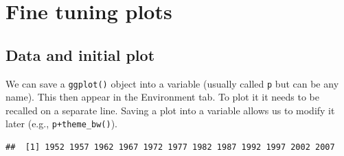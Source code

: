 \documentclass[]{book}
\makeatletter
\newenvironment{Shaded}{\begin{snugshade}}{\end{snugshade}}
\newcommand{\KeywordTok}[1]{\textcolor[rgb]{0.13,0.29,0.53}{\textbf{#1}}}
\newcommand{\DataTypeTok}[1]{\textcolor[rgb]{0.13,0.29,0.53}{#1}}
\newcommand{\DecValTok}[1]{\textcolor[rgb]{0.00,0.00,0.81}{#1}}
\newcommand{\FloatTok}[1]{\textcolor[rgb]{0.00,0.00,0.81}{#1}}
\newcommand{\StringTok}[1]{\textcolor[rgb]{0.31,0.60,0.02}{#1}}
\newcommand{\OtherTok}[1]{\textcolor[rgb]{0.56,0.35,0.01}{#1}}
\newcommand{\OperatorTok}[1]{\textcolor[rgb]{0.81,0.36,0.00}{\textbf{#1}}}
\newcommand{\NormalTok}[1]{#1}
\newenvironment{kframe}{%
\medskip{}
\setlength{\fboxsep}{.8em}
 \def\at@end@of@kframe{}%
 \ifinner\ifhmode%
  \def\at@end@of@kframe{\end{minipage}}%
  \begin{minipage}{\columnwidth}%
 \fi\fi%
 \def\FrameCommand##1{\hskip\@totalleftmargin \hskip-\fboxsep
 \colorbox{shadecolor}{##1}\hskip-\fboxsep
     \hskip-\linewidth \hskip-\@totalleftmargin \hskip\columnwidth}%
 \MakeFramed {\advance\hsize-\width
   \@totalleftmargin\z@ \linewidth\hsize
   \@setminipage}}%
 {\par\unskip\endMakeFramed%
 \at@end@of@kframe}
\renewenvironment{Shaded}{\begin{kframe}}{\end{kframe}}
\makeatother
\begin{document}
\chapter{Fine tuning plots}\label{fine-tuning-plots}

\section{Data and initial plot}\label{data-and-initial-plot}

We can save a \texttt{ggplot()} object into a variable (usually called
\texttt{p} but can be any name). This then appear in the Environment
tab. To plot it it needs to be recalled on a separate line. Saving a
plot into a variable allows us to modify it later (e.g.,
\texttt{p+theme\_bw()}).

\begin{Shaded}
\end{Shaded}

\begin{verbatim}
##  [1] 1952 1957 1962 1967 1972 1977 1982 1987 1992 1997 2002 2007
\end{verbatim}

\begin{Shaded}
\end{Shaded}
\end{document}
